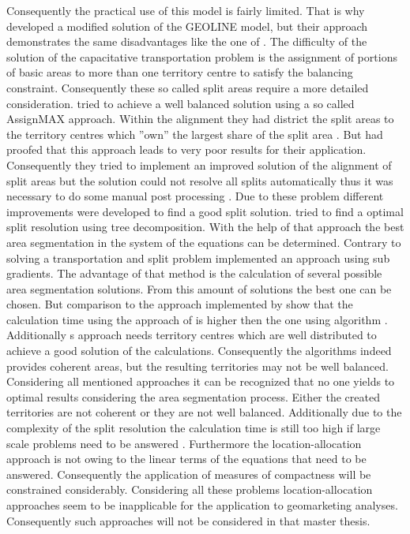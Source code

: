 Consequently the practical use of this model is fairly limited. That is why \citeauthor{fleischmann} \cite{fleischmann} developed a modified solution of the GEOLINE model, but their approach demonstrates the same disadvantages like the one of \citeauthor{hessstuart}. The difficulty of the solution of the capacitative transportation problem is the assignment of portions of basic areas to more than one territory centre to satisfy the balancing constraint. Consequently these so called split areas require a more detailed consideration. \citeauthor{hessstuart} \cite{hessstuart} tried to achieve a well balanced solution using a so called AssignMAX approach. Within the alignment they had district the split areas to the territory centres which ''own'' the largest share of the split area \cite{hessstuart, kalcsics}. But \citeauthor{fleischmann} \cite{fleischmann} had proofed that this approach leads to very poor results for their application. Consequently they tried to implement an improved solution of the alignment of split areas but the solution could not resolve all splits automatically thus it was necessary to do some manual post processing \cite{fleischmann, kalcsics}. Due to these problem different improvements were developed to find a good split solution. \citeauthor{schroeder} \cite{schroeder} tried to find a optimal split resolution using tree decomposition. With the help of that approach the best area segmentation in the system of the equations can be determined. Contrary to solving a transportation and split problem \citeauthor{zoltner} \cite{zoltner} implemented an approach using sub gradients. The advantage of that method is the calculation of several possible area segmentation solutions. From this amount of solutions the best one can be chosen. But comparison to the approach implemented by \citeauthor{schroeder} show that the calculation time using the approach of \citeauthor{zoltner} is higher then the one using \citeauthor{schroeder} algorithm \cite{schroeder}. Additionally \citeauthor{zoltner}s approach needs territory centres which are well distributed to achieve a good solution of the calculations. Consequently the algorithms indeed provides coherent areas, but the resulting territories may not be well balanced. Considering all mentioned approaches it can be recognized that no one yields to optimal results considering the area segmentation process. Either the created territories are not coherent or they are not well balanced. Additionally due to the complexity of the split resolution the calculation time is still too high if large scale problems need to be answered \cite{kalcsics}. Furthermore the location-allocation approach is not owing to the linear terms of the equations that need to be answered. Consequently the application of measures of compactness will be constrained considerably. Considering all these problems location-allocation approaches seem to be inapplicable for the application to geomarketing analyses. Consequently such approaches will not be considered in that master thesis. \\
